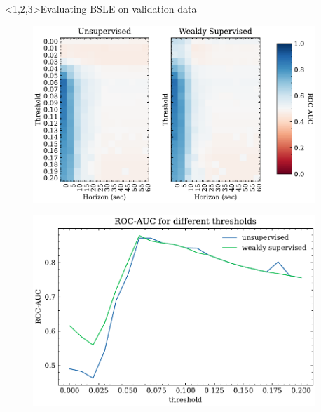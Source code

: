 \documentclass[t]{beamer}
\theoremstyle{definition}
\begin{document}
\begin{frame}<1,2,3>{Evaluating BSLE on validation data}
     {
    \begin{figure}
        \centering
        \includegraphics[width=0.95\textwidth]{figs/auc_roc_scores_for_thresholds_and_horizons_sec.pdf}
        \label{fig:my_label}
    \end{figure}
    }
     {
    \begin{figure}
        \centering
        \includegraphics[width=0.95\textwidth]{figs/roc_auc_score_for_thresholds.pdf}
        \label{fig:my_label}
    \end{figure}
    }
     {
    \begin{columns}


\end{columns}}
\end{frame}
\end{document}
